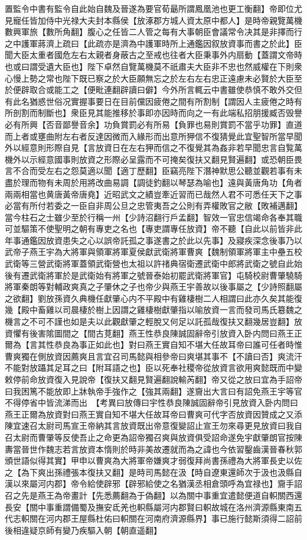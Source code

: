 置監令中書有監令自此始自魏及晉遂為要官荀朂所謂鳳凰池也更工衡翻】帝即位尤見寵任皆加侍中光禄大夫封本縣侯【放涿郡方城人資太原中都人】是時帝親覽萬機數興軍旅【數所角翻】腹心之任皆二人管之每有大事朝臣會議常令决其是非擇而行之中護軍蔣濟上疏曰【此疏亦是濟為中護軍時所上通鑑因叙放資事而書之於此】臣聞大臣太重者國危左右太親者身蔽古之至戒也往者大臣秉事外内扇動【蓋謂文帝時也或曰謂受遺大臣也】陛下卓然自覽萬機莫不祇肅夫大臣非不忠也然威權在下則衆心慢上勢之常也陛下既已察之於大臣願無忘之於左右左右忠正遠慮未必賢於大臣至於便辟取合或能工之【便毗連翻辟讀曰僻】今外所言輒云中書雖使恭慎不敢外交但有此名猶惑世俗况實握事要日在目前儻因疲倦之間有所割制【謂因人主疲倦之時有所剖割而制斷也】衆臣見其能推移於事即亦因時而向之一有此端私招朋援臧否毁譽必有所興【否音鄙譽音余】功負賞罰必有所易【負罪也易則賞罰不當乎功罪】直道而上者或壅曲附左右者反達因微而入緣形而出意所狎信不復猜覺此宜聖智所當早聞外以經意則形際自見【言放資日在左右狎而信之不復覺其為姦非若早聞忠言自覧萬機外以示經意國事則放資之形際必呈露而不可掩矣復扶又翻見賢遍翻】或恐朝臣畏言不合而受左右之怨莫適以聞【適丁歷翻】臣竊亮陛下潛神默思公聽並觀若事有未盡於理而物有未周於用將改曲易調【調徒釣翻以琴瑟為喻也】遠與黃唐角功【角者兩兩相當也黄唐黃帝唐堯】近昭武文之績豈牽近習而已哉然人君不可悉任天下之事必當有所付若委之一臣自非周公旦之忠管夷吾之公則有弄權敗官之敝【敗補邁翻】當今柱石之士雖少至於行稱一州【少詩沼翻行戶孟翻】智效一官忠信竭命各奉其職可並驅策不使聖明之朝有專吏之名也【專吏謂專任放資】帝不聽【自此以前皆非此年事通鑑因放資患失之心以誤帝託孤之事遂書之於此以先事】及寢疾深念後事乃以武帝子燕王宇為大將軍與領軍將軍夏侯獻武衛將軍曹爽【魏制領軍將軍主中壘五校武衛等三營武衛將軍蓋領武衛營也太祖以許禇典宿衛遷武衛中郎將武衛之號自此始後有遷武衛將軍於是武衛始有將軍之號晉泰始初罷武衛將軍官】屯騎校尉曹肇驍騎將軍秦朗等對輔政爽真之子肇休之子也帝少與燕王宇善故以後事屬之【少詩照翻屬之欲翻】劉放孫資久典機任獻肇心内不平殿中有雞棲樹二人相謂曰此亦久矣其能復幾【殿中畜雞以司晨棲於樹上因謂之雞棲樹獻肇指以喻放資一言而發司馬氏簒魏之機言之不可不謹也如是夫以此觀獻肇之輕脫又何足以託孤哉復扶又翻幾居豈翻】放資懼有後害隂圖間之【間古莧翻】燕王性恭良陳誠固辭帝引放資入卧内問曰燕王正爾為【言其性恭良為事正如此也】對曰燕王實自知不堪大任故耳帝曰誰可任者時惟曹爽獨在側放資因薦爽且言宜召司馬懿與相參帝曰爽堪其事不【不讀曰否】爽流汗不能對放躡其足耳之曰【附耳語之也】臣以死奉社稷帝從放資言欲用爽懿既而中變敕停前命放資復入見說帝【復扶又翻見賢遍翻說輸芮翻】帝又從之放曰宜為手詔帝曰我困篤不能放即上牀執帝手強作之【強其兩翻】遂齎出大言曰有詔免燕王宇等官不得停省中皆流涕而出　【考異曰放傳曰宇性恭良陳誠固辭帝引見放資入卧内問曰燕王正爾為放資對曰燕王實自知不堪大任故耳帝曰曹爽可代字否放資因贊成之又添陳宜速召太尉司馬宣王帝納其言放資既出帝意復變詔止宣王勿來尋更見放資曰我自召太尉而曹肇等反使吾止之命更為詔帝獨召爽與放資俱受詔命遂免宇獻肇朗官按陳夀當晉世作魏志若言放資本惰則於時非美故遷就而為之諱也今依習鑿齒漢晉春秋郭頒世語似得其實】甲申以曹爽為大將軍帝嫌爽才弱復拜尚書孫禮為大將軍長史以佐之【為下爽出孫禮張本復扶又翻】是時司馬懿在汲【時自遼東還師次于汲也汲縣自漢以來屬河内郡】帝令給使辟邪【辟邪給使之名猶漢丞相倉頭呼為宜禄也】齎手詔召之先是燕王為帝畫計【先悉薦翻為于偽翻】以為關中事重宜遣懿便道自軹關西還長安【關中事重謂備蜀及撫安氐羌也軹縣屬河内郡賢曰軹故城在洛州濟源縣東南五代志軹關在河内郡王屋縣杜佑曰軹關在河南府濟源縣界】事已施行懿斯須得二詔前後相違疑京師有變乃疾驅入朝【朝直遥翻】

